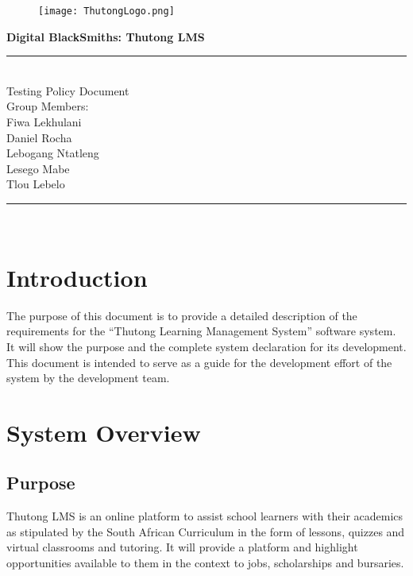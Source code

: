 \documentclass[12pt,a4paper]{article}
\begin{document}
	\begin{titlepage}
		\begin{figure}[t]
			\texttt{[image: ThutongLogo.png]}
		\end{figure}
		\centering
		\textbf{\LARGE Digital BlackSmiths: Thutong LMS}
		\newline
		\rule{\textwidth}{1.6pt}\\[\baselineskip]
		Testing Policy Document\\
		\vspace*{0.5cm}
		\large Group Members: \vspace*{0.3cm}
			{\\Fiwa Lekhulani\\Daniel Rocha\\Lebogang Ntatleng\\Lesego Mabe\\Tlou Lebelo}
		\rule{\textwidth}{1.6pt}\\[\baselineskip]
		\vspace*{\fill}
	\end{titlepage}
	\pagebreak
	
	\section*{Introduction}
	The purpose of this document is to provide a detailed description of the requirements for the “Thutong Learning Management System” software system. It will show the purpose and the complete system declaration for its development. 
		\\This document is intended to serve as a guide for the development effort of the system by the development team.
		
	\section{System Overview}
		\subsection*{Purpose}
		Thutong LMS is an online platform to assist school learners with their academics as stipulated by the South African Curriculum in the form of lessons, quizzes and virtual classrooms and tutoring. It will provide a platform and highlight opportunities available to them in the context to jobs, scholarships and bursaries.
\end{document}
